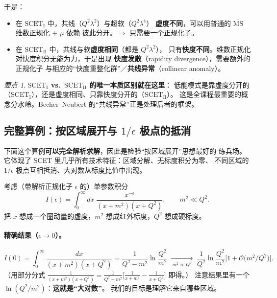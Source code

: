 \documentclass[UTF8,a4paper,11pt]{ctexart}
\theoremstyle{definition}
\theoremstyle{remark}
\newtheorem{keypoint}{要点}[section]
\theoremstyle{plain}
\newcommand{\muMS}{\overline{\mathrm{MS}}}
\newcommand{\SCETI}{\text{SCET}_{\mathrm{I}}}
\newcommand{\SCETII}{\text{SCET}_{\mathrm{II}}}
\newcommand{\en}[1]{\textsf{#1}}   %
\begin{document}
于是：

\begin{itemize}
  \item 在 $\SCETI$ 中，共线（$Q^2\lambda^2$）与超软（$Q^2\lambda^4$）
        \textbf{虚度不同}，可以用普通的 $\muMS$ 维数正规化 $+$ $\mu$ 依赖
        彼此分开。$\Longrightarrow$ 只需要一个正规化子。
  \item 在 $\SCETII$ 中，共线与软\textbf{虚度相同}（都是 $Q^2\lambda^2$），
        只有\textbf{快度不同}。维数正规化对快度积分无能为力，于是出现
        \textbf{快度发散}（\en{rapidity divergence}），需要额外的正规化子
        与相应的“快度重整化群”／\textbf{共线异常}（\en{collinear anomaly}）。
\end{itemize}

\begin{keypoint}
\textbf{$\SCETI$ vs.\ $\SCETII$ 的唯一本质区别就在这里}：
低能模式是靠虚度分开的（$\SCETI$），还是虚度相同、只靠快度分开的（$\SCETII$）。
这是全课程最重要的概念分水岭。Becher--Neubert 的“共线异常”正是处理后者的框架。
\end{keypoint}

\subsection{完整算例：按区域展开与 $1/\epsilon$ 极点的抵消}
\label{subsec:regions}

下面这个算例\textbf{可以完全解析求解}，因此是检验“按区域展开”思想最好的
练兵场。它体现了 SCET 里几乎所有技术特征：区域分解、无标度积分为零、
不同区域的 $1/\epsilon$ 极点互相抵消、大对数从标度比值中出现。

考虑（带解析正规化子 $\epsilon$ 的）单参数积分
\begin{equation}
  I(\epsilon)=\int_0^\infty\! dx\;
  \frac{x^{-\epsilon}}{(x+m^2)(x+Q^2)},
  \qquad m^2\ll Q^2 .
  \label{eq:regint}
\end{equation}
把 $x$ 想成一个圈动量的虚度，$m^2$ 想成红外标度，$Q^2$ 想成硬标度。

\paragraph{精确结果（$\epsilon\to0$）。}
\begin{equation}
  I(0)=\int_0^\infty\!\frac{dx}{(x+m^2)(x+Q^2)}
  =\frac{1}{Q^2-m^2}\ln\frac{Q^2}{m^2}
  \;\xrightarrow[\ m^2\ll Q^2\ ]{}\;
  \frac{1}{Q^2}\ln\frac{Q^2}{m^2}
  \Big[1+\mathcal O\!\big(m^2/Q^2\big)\Big].
  \label{eq:exact}
\end{equation}
（用部分分式 $\frac{1}{(x+m^2)(x+Q^2)}
=\frac{1}{Q^2-m^2}\big[\frac{1}{x+m^2}-\frac{1}{x+Q^2}\big]$ 即得。）
注意结果里有一个 $\ln(Q^2/m^2)$：\textbf{这就是“大对数”}。
我们的目标是理解它来自哪些区域。
\end{document}

